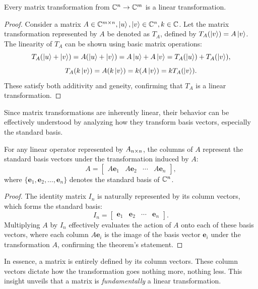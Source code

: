 \documentclass[12pt]{article}
\begin{document}
\begin{theorem}
    Every matrix transformation from $\mathbb{C}^n \rightarrow \mathbb{C}^m$ is a linear transformation. 
\end{theorem}

\begin{proof}
    Consider a matrix $A \in \mathbb{C}^{m \times n}, \ket{u}, \ket{v} \in \mathbb{C}^n, k \in \mathbb{C}$. Let the matrix transformation represented by $A$ be denoted as $T_A$, defined by $T_A(\ket{v}) = A \ket{v}$. The linearity of $T_A$ can be shown using basic matrix operations:
    \[
    T_A(\ket{u} + \ket{v}) = A(\ket{u} + \ket{v}) = A\ket{u} + A\ket{v} = T_A(\ket{u}) + T_A(\ket{v}), 
    \]
    \[
    T_A(k \ket{v}) = A(k \ket{v}) = k (A \ket{v}) = k T_A(\ket{v}).
    \]
    These satisfy both additivity and geneity, confirming that $T_A$ is a linear transformation. 
\end{proof}

Since matrix transformations are inherently linear, their behavior can be effectively understood by analyzing how they transform basis vectors, especially the standard basis. 

\begin{theorem}
    For any linear operator represented by $A_{n \times n}$, the columns of $A$ represent the standard basis vectors under the transformation induced by $A$:
    \[
    A = \begin{bmatrix}
    A \mathbf{e}_1 & A \mathbf{e}_2 & \cdots & A \mathbf{e}_n
    \end{bmatrix},
    \]
    where $\{\mathbf{e}_1, \mathbf{e}_2, \ldots, \mathbf{e}_n\}$ denotes the standard basis of $\mathbb{C}^n$. 
\end{theorem}

\begin{proof}
    The identity matrix $I_n$ is naturally represented by its column vectors, which forms the standard basis:
    \[I_n = \begin{bmatrix}
        \mathbf{e}_1 & \mathbf{e}_2 & \cdots & \mathbf{e}_n
    \end{bmatrix}.
    \]
    Multiplying $A$ by $I_n$ effectively evaluates the action of $A$ onto each of these basis vectors, where each column $A \mathbf{e}_i$ is the image of the basis vector $\mathbf{e}_i$ under the transformation $A$, confirming the theorem's statement. 
\end{proof}

In essence, a matrix is entirely defined by its column vectors. These column vectors dictate how the transformation goes nothing more, nothing less. This insight unveils that a matrix is \textit{fundamentally} a linear transformation. 
\end{document}
